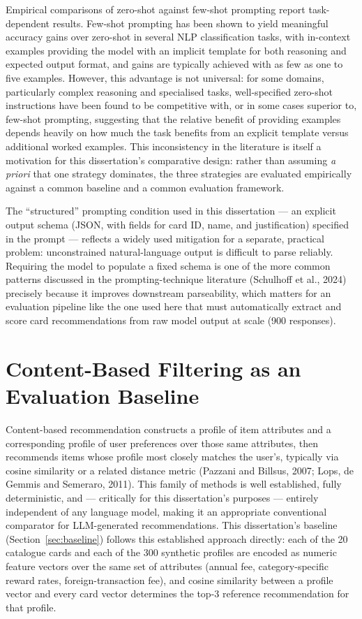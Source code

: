 Empirical comparisons of zero-shot against few-shot prompting report task-dependent results. Few-shot prompting has been shown to yield meaningful accuracy gains over zero-shot in several NLP classification tasks, with in-context examples providing the model with an implicit template for both reasoning and expected output format, and gains are typically achieved with as few as one to five examples. However, this advantage is not universal: for some domains, particularly complex reasoning and specialised tasks, well-specified zero-shot instructions have been found to be competitive with, or in some cases superior to, few-shot prompting, suggesting that the relative benefit of providing examples depends heavily on how much the task benefits from an explicit template versus additional worked examples. This inconsistency in the literature is itself a motivation for this dissertation's comparative design: rather than assuming \textit{a priori} that one strategy dominates, the three strategies are evaluated empirically against a common baseline and a common evaluation framework.

The ``structured'' prompting condition used in this dissertation --- an explicit output schema (JSON, with fields for card ID, name, and justification) specified in the prompt --- reflects a widely used mitigation for a separate, practical problem: unconstrained natural-language output is difficult to parse reliably. Requiring the model to populate a fixed schema is one of the more common patterns discussed in the prompting-technique literature (Schulhoff et al., 2024) precisely because it improves downstream parseability, which matters for an evaluation pipeline like the one used here that must automatically extract and score card recommendations from raw model output at scale (900 responses).

\section{Content-Based Filtering as an Evaluation Baseline}

Content-based recommendation constructs a profile of item attributes and a corresponding profile of user preferences over those same attributes, then recommends items whose profile most closely matches the user's, typically via cosine similarity or a related distance metric (Pazzani and Billsus, 2007; Lops, de Gemmis and Semeraro, 2011). This family of methods is well established, fully deterministic, and --- critically for this dissertation's purposes --- entirely independent of any language model, making it an appropriate conventional comparator for LLM-generated recommendations. This dissertation's baseline (Section~\ref{sec:baseline}) follows this established approach directly: each of the 20 catalogue cards and each of the 300 synthetic profiles are encoded as numeric feature vectors over the same set of attributes (annual fee, category-specific reward rates, foreign-transaction fee), and cosine similarity between a profile vector and every card vector determines the top-3 reference recommendation for that profile.

